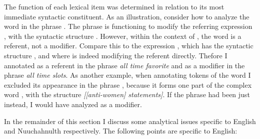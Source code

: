 The function of each lexical item was determined in relation to its most immediate syntactic constituent. As an illustration, consider how to analyze the word  in the phrase . The phrase  is functioning to modify the referring expression , with the syntactic structure . However, within the context of , the word  is a referent, not a modifier. Compare this to the expression , which has the syntactic structure , and where  is indeed modifying the referent  directly. Thefore I annotated  as a referent in the phrase \textit{all time favorite} and as a modifier in the phrase \textit{all time slots}. As another example, when annotating tokens of the word  I excluded its appearance in the phrase , because it forms one part of the complex word , with the structure \textit{[[anti-women] statements]}. If the phrase had been just  instead, I would have analyzed  as a modifier.

In the remainder of this section I discuss some analytical issues specific to English and Nuuchahnulth respectively. The following points are specific to English:


